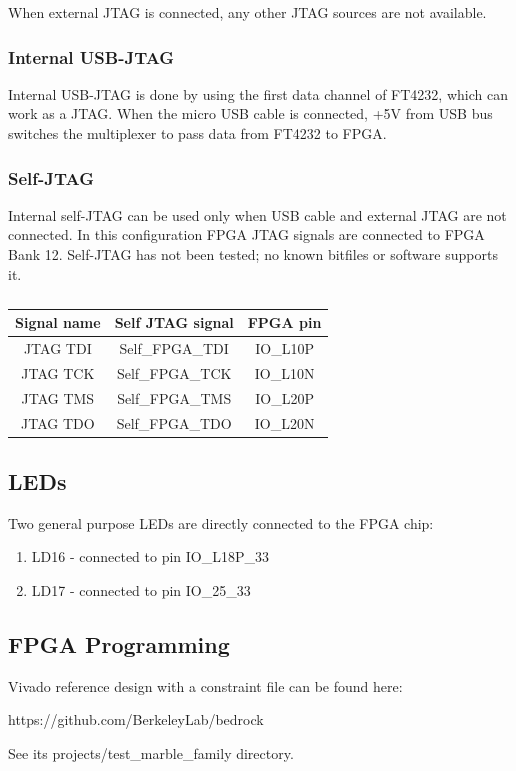 \documentclass[12pt,oneside,a4]{article}
\begin{document}
When external JTAG is connected, any other JTAG sources are not available.

\subsubsection{Internal USB-JTAG}
Internal USB-JTAG is done by using the first data channel of FT4232, which can work as a JTAG. When the micro USB cable is connected, +5V
from USB bus switches the multiplexer to pass data from FT4232 to FPGA.

\subsubsection{Self-JTAG}
Internal self-JTAG can be used only when USB cable and external JTAG are not connected. In this configuration FPGA JTAG signals are connected to FPGA Bank 12.
Self-JTAG has not been tested; no known bitfiles or software supports it.

\begin{table}[htbp]
\centering
\begin{tabular}{@{}ccc@{}}
\toprule
Signal name& Self JTAG signal & FPGA pin \\ \midrule
JTAG TDI & Self\_FPGA\_TDI & IO\_L10P \\
JTAG TCK & Self\_FPGA\_TCK & IO\_L10N \\
JTAG TMS & Self\_FPGA\_TMS & IO\_L20P \\
JTAG TDO & Self\_FPGA\_TDO & IO\_L20N \\ \bottomrule
\end{tabular}
\caption{}
\label{tab:selfjtag}
\end{table}

\subsection{LEDs}
Two general purpose LEDs are directly connected to the FPGA chip:
\begin{enumerate}
	\item LD16 - connected to pin IO\_L18P\_33
	\item LD17 - connected to pin IO\_25\_33
\end{enumerate}

\subsection{FPGA Programming}
Vivado reference design with a constraint file can be found here:
\begin{leftbar}
https://github.com/BerkeleyLab/bedrock
\end{leftbar}
See its projects/test\_marble\_family directory.
\end{document}
